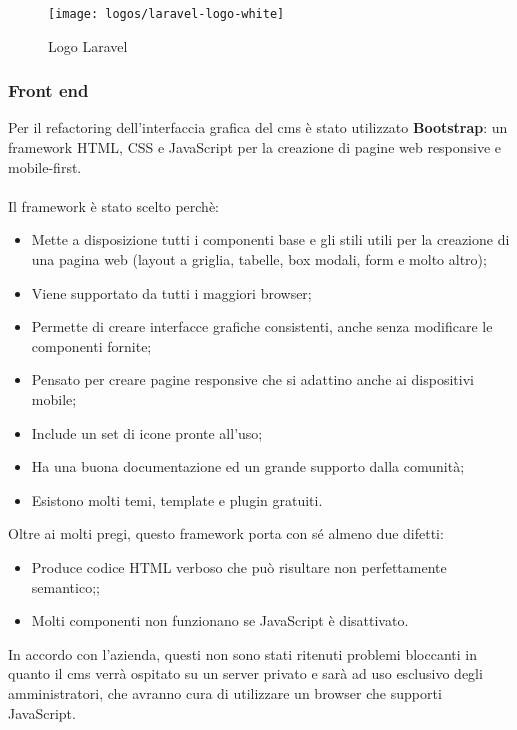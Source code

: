 \begin{figure}[htbp]
\begin{center}
\texttt{[image: logos/laravel-logo-white]}
\caption{Logo Laravel}
\end{center}
\end{figure}

\subsubsection{Front end}
Per il refactoring dell'interfaccia grafica del \gls{cms}\glsfirstoccur{} è stato utilizzato \textbf{Bootstrap}: un framework HTML, CSS e JavaScript per la creazione di pagine web responsive e mobile-first.
\\ \\
Il framework è stato scelto perchè:
\begin{itemize}
	\item Mette a disposizione tutti i componenti base e gli stili utili per la creazione di una pagina web (layout a griglia, tabelle, box modali, form e molto altro);
	\item Viene supportato da tutti i maggiori browser;
	\item Permette di creare interfacce grafiche consistenti, anche senza modificare le componenti fornite;
	\item Pensato per creare pagine responsive che si adattino anche ai dispositivi mobile;
	\item Include un set di icone pronte all'uso;
	\item Ha una buona documentazione ed un grande supporto dalla comunità;
	\item Esistono molti temi, template e plugin gratuiti.
\end{itemize}

Oltre ai molti pregi, questo framework porta con sé almeno due difetti: 
\begin{itemize}
	\item Produce codice HTML verboso che può risultare non perfettamente semantico;;
	\item Molti componenti non funzionano se JavaScript è disattivato.
\end{itemize}

In accordo con l'azienda, questi non sono stati ritenuti problemi bloccanti in quanto il \gls{cms}\glsfirstoccur{} verrà ospitato su un server privato e sarà ad uso esclusivo degli amministratori, che avranno cura di utilizzare un browser che supporti JavaScript.

